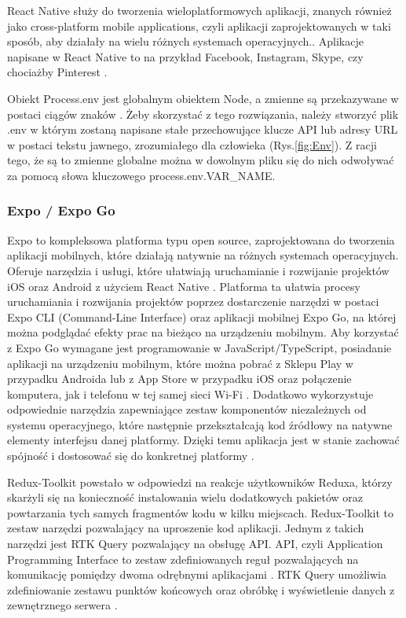 React Native służy do tworzenia wieloplatformowych aplikacji, znanych również jako cross-platform mobile applications, czyli aplikacji zaprojektowanych w taki sposób, aby działały na wielu różnych systemach operacyjnych.. Aplikacje napisane w React Native to na przykład Facebook, Instagram, Skype, czy chociażby Pinterest \cite{javascripteverywhere}.

Obiekt Process.env jest globalnym obiektem Node, a zmienne są przekazywane w postaci ciągów znaków \cite{env}. Żeby skorzystać z tego rozwiązania, należy stworzyć plik .env w którym zostaną napisane stałe przechowujące klucze API lub adresy URL w postaci tekstu jawnego, zrozumiałego dla człowieka (Rys.\ref{fig:Env}). Z racji tego, że są to zmienne globalne można w dowolnym pliku się do nich odwoływać za pomocą słowa kluczowego process.env.VAR\_NAME.

\subsubsection*{\textbf{Expo / Expo Go}}
Expo to kompleksowa platforma typu open source, zaprojektowana do tworzenia aplikacji mobilnych, które działają natywnie na różnych systemach operacyjnych. Oferuje narzędzia i usługi, które ułatwiają uruchamianie i rozwijanie projektów iOS oraz Android z użyciem React Native \cite{javascripteverywhere}. Platforma ta ułatwia procesy uruchamiania i rozwijania projektów poprzez dostarczenie narzędzi w postaci Expo CLI (Command-Line Interface) oraz aplikacji mobilnej Expo Go, na której można podglądać efekty prac na bieżąco na urządzeniu mobilnym. Aby korzystać z Expo Go wymagane jest programowanie w JavaScript/TypeScript, posiadanie aplikacji na urządzeniu mobilnym, które można pobrać z Sklepu Play w przypadku Androida lub z App Store w przypadku iOS oraz połączenie komputera, jak i telefonu w tej samej sieci Wi-Fi \cite{expogo}.
Dodatkowo wykorzystuje odpowiednie narzędzia zapewniające zestaw komponentów niezależnych od systemu operacyjnego, które następnie przekształcają kod źródłowy na natywne elementy interfejsu danej platformy. Dzięki temu aplikacja jest w stanie zachować spójność i dostosować się do konkretnej platformy \cite{reactnative}.



Redux-Toolkit powstało w odpowiedzi na reakcje użytkowników Reduxa, którzy skarżyli się na konieczność instalowania wielu dodatkowych pakietów oraz powtarzania tych samych fragmentów kodu w kilku miejscach. Redux-Toolkit to zestaw narzędzi pozwalający na uproszenie kod aplikacji. Jednym z takich narzędzi jest RTK Query pozwalający na obsługę API. API, czyli Application Programming Interface to zestaw zdefiniowanych reguł pozwalających na komunikację pomiędzy dwoma odrębnymi aplikacjami \cite{api}. RTK Query umożliwia zdefiniowanie zestawu punktów końcowych oraz obróbkę i wyświetlenie danych z zewnętrznego serwera \cite{reduxtoolkit}.

